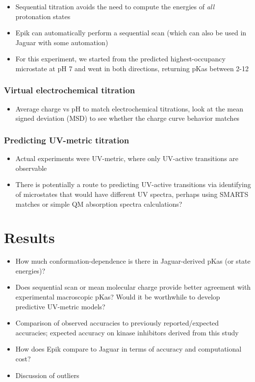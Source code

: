 \documentclass[9pt,lineno,final]{elife}
\begin{document}
\begin{itemize}
	\item Sequential titration avoids the need to compute the energies of \emph{all} protonation states
	\item Epik can automatically perform a sequential scan (which can also be used in Jaguar with some automation)
	\item For this experiment, we started from the predicted highest-occupancy microstate at pH 7 and went in both directions, returning pKas between 2-12
\end{itemize}

\subsubsection{Virtual electrochemical titration}
\begin{itemize}
	\item Average charge vs pH to match electrochemical titrations, look at the mean signed deviation (MSD) to see whether the charge curve behavior matches
\end{itemize}

\subsubsection{Predicting UV-metric titration}
\begin{itemize}
	\item Actual experiments were UV-metric, where only UV-active transitions are observable
	\item There is potentially a route to predicting UV-active transitions via identifying of microstates that would have different UV spectra, perhaps using SMARTS matches or simple QM absorption spectra calculations?
\end{itemize}

\section{Results}
\begin{itemize}
	\item How much conformation-dependence is there in Jaguar-derived pKas (or state energies)?
	\item Does sequential scan or mean molecular charge provide better agreement with experimental macroscopic pKas? Would it be worthwhile to develop predictive UV-metric models?
	\item Comparison of observed accuracies to previously reported/expected accuracies; expected accuracy on kinase inhibitors derived from this study
	\item How does Epik compare to Jaguar in terms of accuracy and computational cost?
	\item Discussion of outliers
\end{itemize}
\end{document}
